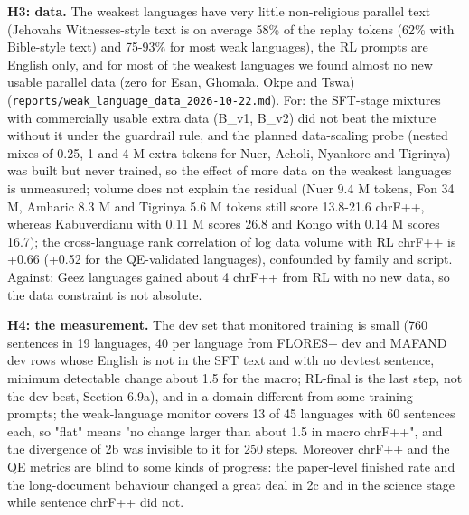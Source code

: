\textbf{H3: data.} The weakest languages have very little non-religious parallel text (Jehovah\textquotesingle s Witnesses-style text is on average 58\% of the replay tokens (62\% with Bible-style text) and 75-93\% for most weak languages), the RL prompts are English only, and for most of the weakest languages we found almost no new usable parallel data (zero for Esan, Ghomala, Okpe and Tswa) (\texttt{reports/weak\_language\_data\_2026-10-22.md}). For: the SFT-stage mixtures with commercially usable extra data (B\_v1, B\_v2) did not beat the mixture without it under the guardrail rule, and the planned data-scaling probe (nested mixes of 0.25, 1 and 4 M extra tokens for Nuer, Acholi, Nyankore and Tigrinya) was built but never trained, so the effect of more data on the weakest languages is unmeasured; volume does not explain the residual (Nuer 9.4 M tokens, Fon 34 M, Amharic 8.3 M and Tigrinya 5.6 M tokens still score 13.8-21.6 chrF++, whereas Kabuverdianu with 0.11 M scores 26.8 and Kongo with 0.14 M scores 16.7); the cross-language rank correlation of log data volume with RL chrF++ is +0.66 (+0.52 for the QE-validated languages), confounded by family and script. Against: Ge\textquotesingle ez languages gained about 4 chrF++ from RL with no new data, so the data constraint is not absolute.

\textbf{H4: the measurement.} The dev set that monitored training is small (760 sentences in 19 languages, 40 per language from FLORES+ dev and MAFAND dev rows whose English is not in the SFT text and with no devtest sentence, minimum detectable change about 1.5 for the macro; RL-final is the last step, not the dev-best, Section 6.9a), and in a domain different from some training prompts; the weak-language monitor covers 13 of 45 languages with 60 sentences each, so "flat" means "no change larger than about 1.5 in macro chrF++", and the divergence of 2b was invisible to it for 250 steps. Moreover chrF++ and the QE metrics are blind to some kinds of progress: the paper-level finished rate and the long-document behaviour changed a great deal in 2c and in the science stage while sentence chrF++ did not.

